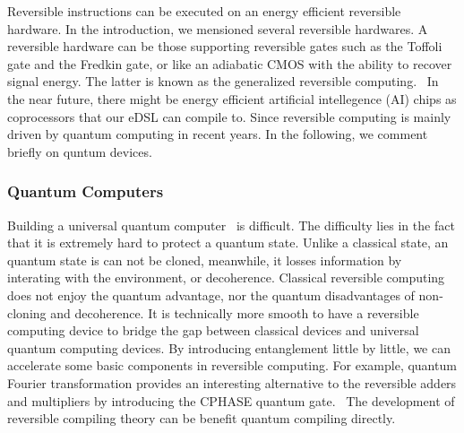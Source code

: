 \documentclass[aps,twocolumn,longbibliography,english,superscriptaddress]{revtex4-1}
\newcommand{\<}{\langle}
\renewcommand{\>}{\rangle}
\theoremstyle{definition}\newtheorem{definition}{\textit{Definition}}
\begin{document}
Reversible instructions can be executed on an energy efficient reversible hardware.
In the introduction, we mensioned several reversible hardwares. A reversible hardware can be those supporting reversible gates such as the Toffoli gate and the Fredkin gate, or like an adiabatic CMOS with the ability to recover signal energy. The latter is known as the generalized reversible computing.~\cite{Frank2005,Frank2017b}
In the near future, there might be energy efficient artificial intellegence (AI) chips as coprocessors that our eDSL can compile to.
Since reversible computing is mainly driven by quantum computing in recent years.
In the following, we comment briefly on quntum devices.

\subsubsection{Quantum Computers}\label{sec:qc}
Building a universal quantum computer~\cite{Nielsen2002} is difficult. 
The difficulty lies in the fact that it is extremely hard to protect a quantum state.
Unlike a classical state, an quantum state is can not be cloned, meanwhile, it losses information by interating with the environment, or decoherence.
Classical reversible computing does not enjoy the quantum advantage, nor the quantum disadvantages of non-cloning and decoherence.
It is technically more smooth to have a reversible computing device to bridge the gap between classical devices and universal quantum computing devices.
By introducing entanglement little by little, we can accelerate some basic components in reversible computing. For example, quantum Fourier transformation provides an interesting alternative to the reversible adders and multipliers by introducing the CPHASE quantum gate.~\cite{RuizPerez2017}
The development of reversible compiling theory can be benefit quantum compiling directly.
\end{document}
